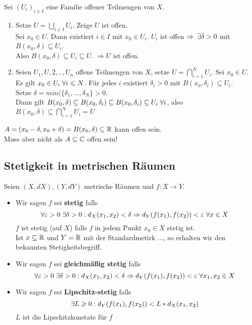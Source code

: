 \documentclass[main.tex]{subfiles}
\begin{document}
\begin{Beweis}
  Sei $(U_i)_{i \in I}$ eine Familie offener Teilmengen von $X$.
  \begin{enumerate}
    \item Setze $U = \bigcup_{i \in I} U_i$. Zeige $U$ ist offen.\\
      Sei $x_0 \in U$. Dann existiert $i \in I$ mit $x_0 \in U_i$. $U_i$ ist offen $\Rightarrow \;\exists \delta > 0$ mit $B(x_0,\delta) \subseteq U_i$.\\
      Also $B(x_0, \delta) \subseteq U_i \subseteq U$. $\Rightarrow U$ ist offen.
    \item Seien $U_1,U,2,..,U_n$ offene Teilmengen von $X$, setze $U = \bigcap_{i=1}^N U_i$. Sei $x_0 \in U$.\\
    Es gilt $x_0 \in U_i \;\forall i \leqslant N$. Für jedes $i$ existiert $\delta_i > 0$ mit $B(x_0,\delta_i) \subseteq U_i$.\\
    Setze $\delta = min(\{\delta_1,...,\delta_N\} > 0$.\\
    Dann gilt $B(x_0,\delta) \subseteq B(x_0, \delta_i) \subseteq B(x_0,\delta_i) \subseteq U_i \;\forall i$, also $B(x_0,\delta) \subseteq \bigcap_{i=1}^N U_i = U$
  \end{enumerate}
\end{Beweis}

\begin{Bemerkung}
  $A = (x_0 - \delta,x_0 + \delta) = B(x_0,\delta) \subseteq \mathbb{R}$ kann offen sein.\\
  Muss aber nicht als $A \subseteq \mathbb{C}$ offen sein!
\end{Bemerkung}


\subsection{Stetigkeit in metrischen Räumen}

\begin{Definition}[Stetigkeit]
  Seien $(X,dX),(Y,dY)$ metrische Räumen und $f: X \to Y$.
  \begin{itemize}
    \item  Wir sagen $f$ sei \textbf{stetig} falls
      $$\;\forall \varepsilon > 0 \;\exists \delta > 0 :d_X (x_1,x_2) < \delta \Rightarrow d_Y(f(x_1),f(x_2))<\varepsilon \;\forall x \in X$$
      $f$ ist stetig (auf $X$) falls $f$ in jedem Punkt $x_0 \in X$ stetig ist.\\
      Ist $x \subseteq \mathbb{R}$ und $Y = \mathbb{R}$ mit der Standardmetirk ..., so erhalten wir den bekannten Stetigkeitsbegriff.
    \item Wir sagen $f$ sei \textbf{gleichmäßig stetig} falls
      $$\;\forall \varepsilon > 0 \;\exists \delta > 0 :d_X (x_1,x_2) < \delta \Rightarrow d_Y(f(x_1),f(x_2))<\varepsilon \;\forall x_1,x_2 \in X$$
    \item Wir sagen $f$ sei \textbf{Lipschitz-stetig} falls
      $$\;\exists L \geqslant 0 : d_Y(f(x_1),f(x_2)) < L*d_X (x_1,x_2)$$
      $L$ ist die Lipschitzkonstate für $f$
  \end{itemize}
\end{Definition}
\end{document}
